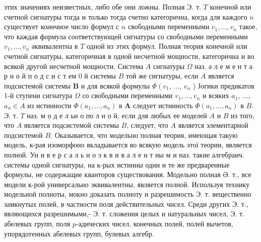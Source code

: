 \documentclass[10pt]{article}
\begin{document}
этих значениях неизвестных, либо обе они ложны. Полная Э. т. $T$ конечной или счетной сигнатуры тогда и только тогда счетно категорична, когда для каждого $n$ существует конөчное число формул с $n$ свободными переменными $v_{1}, \ldots, v_{n}$ такое, что каждая формула соответствующей сигнатуры со свободными переменными $v_{1}, \ldots, v_{n}$ әквивалентна в $T$ одной из этих формул. Полная теория конечной или счетной сигнатуры, категоричная в одной несчетной мощности, категорична и во всякой другой несчетной мощности. Система $A$ сигнатуры $\Omega$ наз. ә л е м е н т а р н о й п о д с и с т ем 0 й системы $B$ той же сигнатуры, если $A$ является подсистемой системы $\boldsymbol{B}$ и для всякой формулы $\Phi\left(v_{1}\right.$, ..., $v_{n}$ ) Јогики предикатов 1-й ступени сигнатура $\Omega$ со свободными переменными $v_{1}, \ldots, v_{n}$ и всяких $a_{1}$, ..., $a_{n} \in A$ из истинности $\Phi\left(a_{1}, \ldots, a_{n}\right)$ в $\boldsymbol{A}$ следует истинность $\Phi\left(a_{1}, \ldots, a_{n}\right)$ в $B$. Э. т. $T$ наз. м о д е л ьн о по л н о й, если для любых ее моделей $A$ и $B$ из того, что $A$ является подсистемой системы $B$, следует, что $A$ является элементарной подсистемой $B$. Оказывается, что модельно полная теория, имеющая такую модель, к-рая изоморфоно вкладывается во всякую модель этої теории, является полной. Ун и в е р с а л ь н о э к в и в а л е н т ны м и наз. такие алгебраич. системы одной сигнатуры, на к-рых истинны одни и те же предваренные формулы, не содержащие кванторов существования. Модельно полная Ә. т., все модели к-рой универсально эквивалентны, является полной. Используя технику модельной полноты, мокно доказать полноту и разрешимость Э. т. вещественно замкнутых полей, в частности поля действительных чисел. Среди других Э. т., являющихся разрешимыми,- Э. т. сложения целых и натуральных чисел, Э. т. абелевых групп, поля $p$-адических чисел, конечных полей, полей вычетов, упорядотенных абелевых групп, булевых алгебр.
\end{document}
